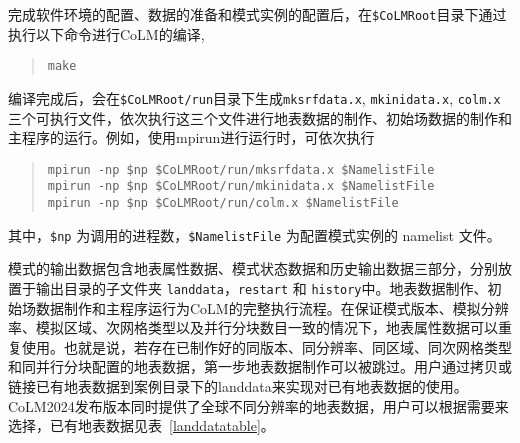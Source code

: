 完成软件环境的配置、数据的准备和模式实例的配置后，在\texttt{\$CoLMRoot}目录下通过执行以下命令进行CoLM的编译,
\begin{quote}
\begin{lstlisting}
make
\end{lstlisting}
\end{quote}
编译完成后，会在\texttt{\$CoLMRoot/run}目录下生成\texttt{mksrfdata.x}, \texttt{mkinidata.x}, \texttt{colm.x} 三个可执行文件，依次执行这三个文件进行地表数据的制作、初始场数据的制作和主程序的运行。例如，使用mpirun进行运行时，可依次执行
\begin{quote}\label{runcolm}
\begin{lstlisting}
mpirun -np $np $CoLMRoot/run/mksrfdata.x $NamelistFile
mpirun -np $np $CoLMRoot/run/mkinidata.x $NamelistFile
mpirun -np $np $CoLMRoot/run/colm.x $NamelistFile
\end{lstlisting}
\end{quote}
其中，\verb|$np| 为调用的进程数，\verb|$NamelistFile| 为配置模式实例的 namelist 文件。

模式的输出数据包含地表属性数据、模式状态数据和历史输出数据三部分，分别放置于输出目录的子文件夹 \texttt{landdata}，\texttt{restart} 和 \texttt{history}中。地表数据制作、初始场数据制作和主程序运行为CoLM的完整执行流程。在保证模式版本、模拟分辨率、模拟区域、次网格类型以及并行分块数目一致的情况下，地表属性数据可以重复使用。也就是说，若存在已制作好的同版本、同分辨率、同区域、同次网格类型和同并行分块配置的地表数据，第一步地表数据制作可以被跳过。用户通过拷贝或链接已有地表数据到案例目录下的landdata来实现对已有地表数据的使用。CoLM2024发布版本同时提供了全球不同分辨率的地表数据，用户可以根据需要来选择，已有地表数据见表~\ref{landdatatable}。

